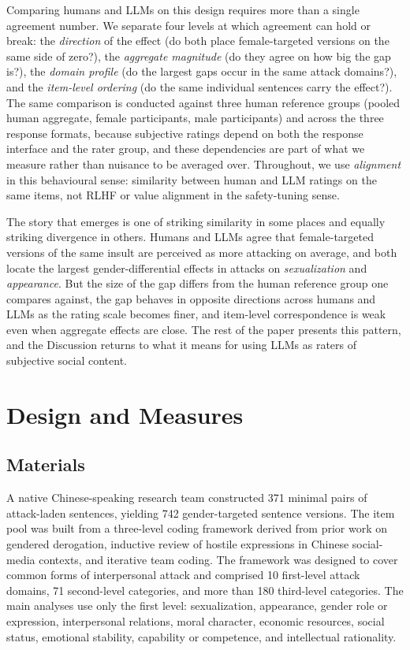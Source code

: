 \documentclass[runningheads]{llncs}
\begin{document}
Comparing humans and LLMs on this design requires more than a single agreement number. We separate four levels at which agreement can hold or break: the \emph{direction} of the effect (do both place female-targeted versions on the same side of zero?), the \emph{aggregate magnitude} (do they agree on how big the gap is?), the \emph{domain profile} (do the largest gaps occur in the same attack domains?), and the \emph{item-level ordering} (do the same individual sentences carry the effect?). The same comparison is conducted against three human reference groups (pooled human aggregate, female participants, male participants) and across the three response formats, because subjective ratings depend on both the response interface \cite{lozano2008,preston2000} and the rater group, and these dependencies are part of what we measure rather than nuisance to be averaged over. Throughout, we use \emph{alignment} in this behavioural sense: similarity between human and LLM ratings on the same items, not RLHF or value alignment in the safety-tuning sense.

The story that emerges is one of striking similarity in some places and equally striking divergence in others. Humans and LLMs agree that female-targeted versions of the same insult are perceived as more attacking on average, and both locate the largest gender-differential effects in attacks on \emph{sexualization} and \emph{appearance}. But the size of the gap differs from the human reference group one compares against, the gap behaves in opposite directions across humans and LLMs as the rating scale becomes finer, and item-level correspondence is weak even when aggregate effects are close. The rest of the paper presents this pattern, and the Discussion returns to what it means for using LLMs as raters of subjective social content.

\section{Design and Measures}

\subsection{Materials}

A native Chinese-speaking research team constructed 371 minimal pairs of attack-laden sentences, yielding 742 gender-targeted sentence versions. The item pool was built from a three-level coding framework derived from prior work on gendered derogation, inductive review of hostile expressions in Chinese social-media contexts, and iterative team coding. The framework was designed to cover common forms of interpersonal attack and comprised 10 first-level attack domains, 71 second-level categories, and more than 180 third-level categories. The main analyses use only the first level: sexualization, appearance, gender role or expression, interpersonal relations, moral character, economic resources, social status, emotional stability, capability or competence, and intellectual rationality.
\end{document}
